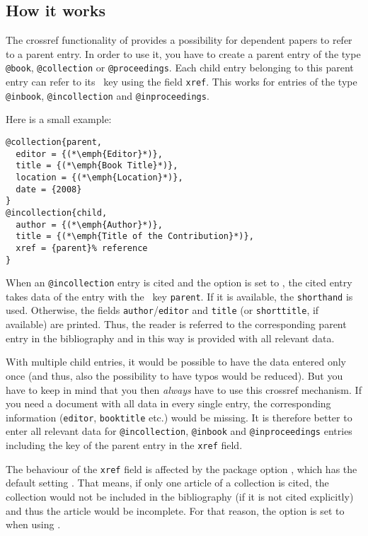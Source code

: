 \documentclass[english]{scrartcl}
\begin{document}
\subsection{How it works}
The crossref functionality of \bldw{} provides a possibility for
dependent papers to refer to a parent entry. In order to use it, you
have to create a parent entry of the type \texttt{@book}, \texttt{@collection}
or \texttt{@proceedings}. Each child entry belonging to this parent entry can
refer to its \BibTeX\ key using the field \texttt{xref}. This works for entries
of the type \texttt{@inbook}, \texttt{@incollection} and \texttt{@inproceedings}.

Here is a small example:
\begin{lstlisting}
@collection{parent,
  editor = {(*\emph{Editor}*)},
  title = {(*\emph{Book Title}*)},
  location = {(*\emph{Location}*)},
  date = {2008}
}
@incollection{child,
  author = {(*\emph{Author}*)},
  title = {(*\emph{Title of the Contribution}*)},
  xref = {parent}% reference
}
\end{lstlisting}
When an \texttt{@incollection} entry is cited and the option  is set
to , the cited entry takes data of the entry with
the \BibTeX\ key \texttt{parent}. If it is available, the \texttt{shorthand}
is used. Otherwise, the fields \texttt{author}\slash\texttt{editor} and \texttt{title}
(or \texttt{shorttitle}, if available) are printed. Thus, the reader is
referred to the corresponding parent entry in the bibliography and in this way
is provided with all relevant data. 

With multiple child entries, it would be possible to have the data entered only
once (and thus, also the possibility to have typos would be reduced). But you
have to keep in mind that you then \emph{always} have to use this crossref 
mechanism. If you need a document with all data in every single entry, the corresponding
information (\texttt{editor}, \texttt{booktitle} etc.) would be missing. It is
therefore better to enter all relevant data for \texttt{@incollection}, \texttt{@inbook} 
and \texttt{@inproceedings} entries including the \BibTeX{} key of the parent
entry in the \texttt{xref} field. 

The behaviour of the \texttt{xref} field is affected by the package option
, which has the default setting . That means, if only
one article of a collection is cited, the collection would not be included in the
bibliography (if it is not cited explicitly) and thus the article would be incomplete.
For that reason, the option  is set to  when using
.
\end{document}
